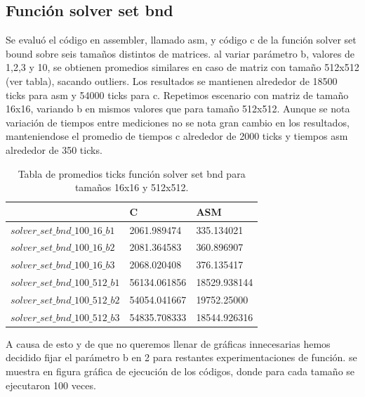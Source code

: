  
 
\subsection{Función solver set bnd}
 
Se evaluó el código en assembler, llamado asm, y código c de la función solver set bound sobre seis tamaños distintos de matrices. al variar parámetro b, valores de 1,2,3 y 10, se obtienen promedios similares en caso de matriz con tamaño 512x512 (ver tabla), sacando outliers. Los resultados se mantienen alrededor de 18500 ticks para asm y 54000 ticks para c. 
Repetimos escenario con matriz de tamaño 16x16, variando b en mismos valores que para tamaño 512x512. Aunque se nota 
variación de tiempos entre mediciones no se nota gran cambio en los resultados, manteniendose el promedio de tiempos c alrededor de 2000 ticks y tiempos asm alrededor de 350 ticks.\newline
\begin{table}[htbp]
\begin{center}
\begin{tabular}{|l|l|l|}
\hline
  & C & ASM\\
\hline \hline
$solver\_set\_bnd\_100\_16\_b1$ & 2061.989474 & 335.134021\\ \hline
$solver\_set\_bnd\_100\_16\_b2$  & 2081.364583 & 360.896907\\ \hline
$solver\_set\_bnd\_100\_16\_b3$  & 2068.020408 & 376.135417 \\ 
\hline \hline
$solver\_set\_bnd\_100\_512\_b1$  & 56134.061856 & 18529.938144 \\ \hline

$solver\_set\_bnd\_100\_512\_b2$  & 54054.041667 & 19752.25000 \\ \hline

$solver\_set\_bnd\_100\_512\_b3$  &  54835.708333 & 18544.926316 \\ \hline

\end{tabular}
\caption{Tabla de promedios ticks función solver set bnd para tamaños 16x16 y 512x512.}
\end{center}
\end{table}
\newline
\newline
A causa de esto y de que no queremos llenar de gráficas innecesarias hemos decidido fijar el parámetro b en 2 para restantes experimentaciones de función. 
se muestra en figura gráfica de ejecución de los códigos, donde para cada tamaño se ejecutaron 100 veces.
